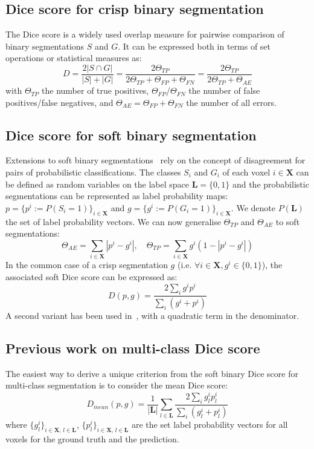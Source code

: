 \documentclass[runningheads,orivec,a4paper]{llncs}
\begin{document}
\subsection{Dice score for crisp binary segmentation}
The Dice score is a widely used overlap measure for pairwise comparison of binary segmentations $S$ and $G$. It can be expressed both in terms of set operations or statistical measures as:
\begin{equation}\label{dice}
D = \frac{2|S \cap G|}{|S| + |G|} = \frac{2\Theta_{TP}}{2\Theta_{TP} + \Theta_{FP} + \Theta_{FN}} = \frac{2\Theta_{TP}}{2\Theta_{TP} + \Theta_{AE}}
\end{equation}
with $\Theta_{TP}$ the number of true positives, $\Theta_{FP}$/$\Theta_{FN}$ the number of false positives/false negatives, and $\Theta_{AE}=\Theta_{FP}+\Theta_{FN}$ the number of all errors.

\subsection{Dice score for soft binary segmentation}
Extensions to soft binary
segmentations~\cite{Anbeek2005,chang2009performance} rely on the
concept of disagreement for pairs of probabilistic classifications.
The classes $S_i$ and $G_i$ of each voxel $i \in \mathbf{X}$ can be defined
as random variables on the label space $\mathbf{L}=\{0,1\}$ and the
probabilistic segmentations can be represented as label probability
maps: $p=\{p^i:=P(S_i=1)\}_{i \in \mathbf{X}}$ and
$g=\{g^i:=P(G_i=1)\}_{i \in \mathbf{X}}$. 
We denote $P({\mathbf{L}})$ the set of label
probability vectors.
%
We can now generalise $\Theta_{TP}$ and $\Theta_{AE}$ to soft
segmentations:
\begin{equation}\label{soft_dsc}
\Theta_{AE} = \sum_{i \in \mathbf{X}} |p^i - g^i|, \quad
\Theta_{TP} = \sum_{i \in \mathbf{X}}g^i(1 - |p^i - g^i|)
\end{equation}
In the common case of a crisp segmentation $g$ (i.e. $\forall i \in \mathbf{X}, g^i \in \{0,1\}$), the associated soft Dice score can be expressed as:
\begin{equation}
D(p,g) = \frac{2\sum_i g^ip^i}{\sum_i (g^i + p^i)}
\end{equation}
%
A second variant has been used in~\cite{v_net}, with a quadratic term in the denominator.


\subsection{Previous work on multi-class Dice score}
The easiest way to derive a unique criterion from the soft binary Dice score for multi-class segmentation is to consider the mean Dice score:
\begin{equation}\label{mean_dice}
 D_{mean}(p,g) = \frac{1}{|\mathbf{L}|}\sum_{l \in \mathbf{L}}\frac{2\sum_i g^i_lp^i_l}{\sum_i (g^i_l + p^i_l)}
\end{equation}
where $\{g^i_l\}_{i \in \mathbf{X},\, l \in \mathbf{L}}$, $\{p^i_l\}_{i \in \mathbf{X},\, l \in \mathbf{L}}$ are the set label probability vectors for all voxels for the ground truth and the prediction.
\end{document}
